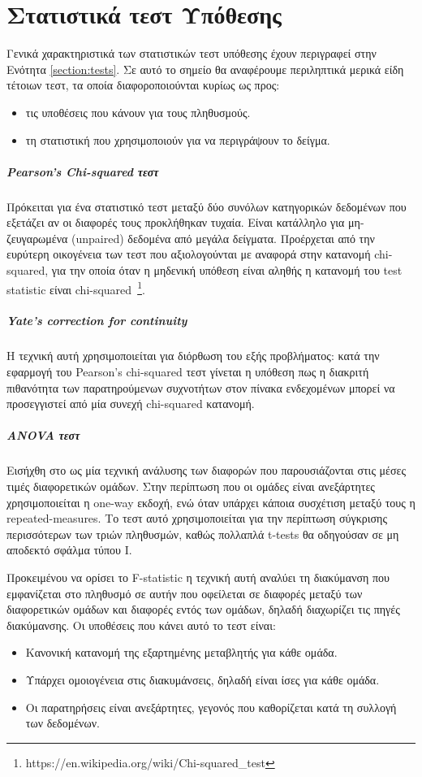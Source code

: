 \chapter{Στατιστικά τεστ Υπόθεσης}
\label{appendix:Tests}
Γενικά χαρακτηριστικά των στατιστικών τεστ υπόθεσης έχουν περιγραφεί στην Ενότητα \ref{section:tests}. Σε αυτό το σημείο θα αναφέρουμε περιληπτικά μερικά είδη τέτοιων τεστ, τα οποία διαφοροποιούνται κυρίως ως προς:
\begin{itemize}
	\item τις υποθέσεις που κάνουν για τους πληθυσμούς.
	\item τη στατιστική που χρησιμοποιούν για να περιγράψουν το δείγμα.
\end{itemize}
\paragraph{Pearson's Chi-squared τεστ}
Πρόκειται για ένα στατιστικό τεστ μεταξύ δύο συνόλων κατηγορικών δεδομένων που εξετάζει αν οι διαφορές τους προκλήθηκαν τυχαία. Είναι κατάλληλο για μη-ζευγαρωμένα (unpaired) δεδομένα από μεγάλα δείγματα. Προέρχεται από την ευρύτερη οικογένεια των τεστ που αξιολογούνται με αναφορά στην κατανομή chi-squared, για την οποία όταν η μηδενική υπόθεση είναι αληθής η κατανομή του test statistic είναι chi-squared~\footnote{https://en.wikipedia.org/wiki/Chi-squared\_test}. 
\paragraph{Yate's correction for continuity}
Η τεχνική αυτή χρησιμοποιείται για διόρθωση του εξής προβλήματος: κατά την εφαρμογή του Pearson's chi-squared τεστ γίνεται η υπόθεση πως η διακριτή πιθανότητα των παρατηρούμενων συχνοτήτων στον πίνακα ενδεχομένων μπορεί να προσεγγιστεί από μία συνεχή chi-squared κατανομή.
\paragraph{ANOVA τεστ} Εισήχθη στο \citet{QJ:QJ49708235130} ως μία τεχνική ανάλυσης των διαφορών που παρουσιάζονται στις μέσες τιμές διαφορετικών ομάδων. Στην περίπτωση που οι ομάδες είναι ανεξάρτητες χρησιμοποιείται η one-way εκδοχή, ενώ όταν υπάρχει κάποια συσχέτιση μεταξύ τους η repeated-measures. Το τεστ αυτό χρησιμοποιείται για την περίπτωση σύγκρισης περισσότερων των τριών πληθυσμών, καθώς πολλαπλά t-tests θα οδηγούσαν σε μη αποδεκτό σφάλμα τύπου Ι. 

Προκειμένου να ορίσει το F-statistic η τεχνική αυτή αναλύει τη διακύμανση που εμφανίζεται στο πληθυσμό σε αυτήν που οφείλεται σε διαφορές μεταξύ των διαφορετικών ομάδων και διαφορές εντός των ομάδων, δηλαδή διαχωρίζει τις πηγές διακύμανσης. Οι υποθέσεις που κάνει αυτό το τεστ είναι:
\begin{itemize}
	\item Κανονική κατανομή της εξαρτημένης μεταβλητής για κάθε ομάδα.
	\item Υπάρχει ομοιογένεια στις διακυμάνσεις, δηλαδή είναι ίσες για κάθε ομάδα.
	\item Οι παρατηρήσεις είναι ανεξάρτητες, γεγονός που καθορίζεται κατά τη συλλογή των δεδομένων.
\end{itemize}

